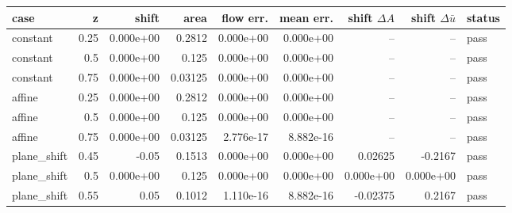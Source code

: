 \begin{tabular}{lrrrrrrrl}
\toprule
case & z & shift & area & flow err. & mean err. & shift $\Delta A$ & shift $\Delta \bar u$ & status \\
\midrule
constant & 0.25 & 0.000e+00 & 0.2812 & 0.000e+00 & 0.000e+00 & -- & -- & pass \\
constant & 0.5 & 0.000e+00 & 0.125 & 0.000e+00 & 0.000e+00 & -- & -- & pass \\
constant & 0.75 & 0.000e+00 & 0.03125 & 0.000e+00 & 0.000e+00 & -- & -- & pass \\
affine & 0.25 & 0.000e+00 & 0.2812 & 0.000e+00 & 0.000e+00 & -- & -- & pass \\
affine & 0.5 & 0.000e+00 & 0.125 & 0.000e+00 & 0.000e+00 & -- & -- & pass \\
affine & 0.75 & 0.000e+00 & 0.03125 & 2.776e-17 & 8.882e-16 & -- & -- & pass \\
plane\_shift & 0.45 & -0.05 & 0.1513 & 0.000e+00 & 0.000e+00 & 0.02625 & -0.2167 & pass \\
plane\_shift & 0.5 & 0.000e+00 & 0.125 & 0.000e+00 & 0.000e+00 & 0.000e+00 & 0.000e+00 & pass \\
plane\_shift & 0.55 & 0.05 & 0.1012 & 1.110e-16 & 8.882e-16 & -0.02375 & 0.2167 & pass \\
\bottomrule
\end{tabular}

